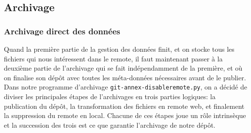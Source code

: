 \documentclass[11pt]{article}
\begin{document}
\subsection{Archivage}
\label{sec:org0e4681d}
\subsubsection{Archivage direct des données}
\label{sec:org8eeb868}
Quand la première partie de la gestion des données finit, et on stocke
tous les fichiers qui nous intéressent dans le remote, il faut
maintenant passer à la deuxième partie de l'archivage qui se fait
indépendamment de la première, et où on finalise son dépôt avec toutes
les méta-données nécessaires avant de le publier.
Dans notre programme d'archivage \texttt{git-annex-disableremote.py}, on a
décidé de diviser les principales étapes de l'archivages en trois
parties logiques: la publication du dépôt, la transformation des
fichiers en remote web, et finalement la suppression du remote en
local. Chacune de ces étapes joue un rôle intrinsèque et la succession
des trois est ce que garantie l'archivage de notre dépôt.
\end{document}
